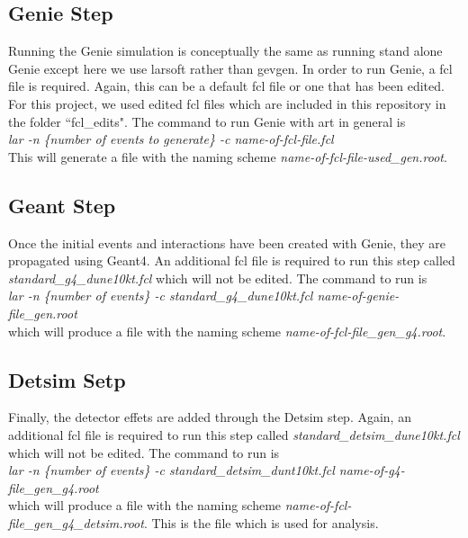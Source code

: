 \documentclass{article}
\begin{document}
\subsection{Genie Step}
Running the Genie simulation is conceptually the same as running stand alone Genie except here we use larsoft rather than gevgen. In order to run Genie, a fcl file is required. Again, this can be a default fcl file or one that has been edited. For this project, we used edited fcl files which are included in this repository in the folder ``fcl\_edits". The command to run Genie with art in general is
\\
\textit{lar -n \{number of events to generate\} -c name-of-fcl-file.fcl}
\\
This will generate a file with the naming scheme \textit{name-of-fcl-file-used\_gen.root}.

\subsection{Geant Step}
Once the initial events and interactions have been created with Genie, they are propagated using Geant4. An additional fcl file is required to run this step called \textit{standard\_g4\_dune10kt.fcl}
which will not be edited. The command to run is
\\
\textit{lar -n \{number of events\} -c standard\_g4\_dune10kt.fcl name-of-genie-file\_gen.root}
\\
which will produce a file with the naming scheme \textit{name-of-fcl-file\_gen\_g4.root}.

\subsection{Detsim Setp}
Finally, the detector effets are added through the Detsim step. Again, an additional fcl file is required to run this step called \textit{standard\_detsim\_dune10kt.fcl} which will not be edited. The command to run is
\\
\textit{lar -n \{number of events\} -c standard\_detsim\_dunt10kt.fcl name-of-g4-file\_gen\_g4.root}
\\
which will produce a file with the naming scheme \textit{name-of-fcl-file\_gen\_g4\_detsim.root}. This is the file which is used for analysis. 


 
\end{document}
